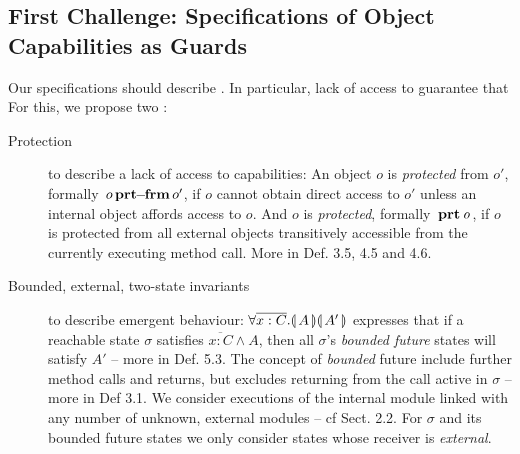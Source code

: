



\subsection{First Challenge: Specifications of Object Capabilities as Guards}
\label{s:approach:necopers}


Our specifications should describe . 
In particular, lack of access to  guarantee  that 
For this, we propose two %
:

 
\begin{description}
\item[Protection] to describe a lack of access to capabilities: An object $o$ is \emph{protected} from $o'$, formally ${\, o\, \mathbf{prt\!\!-\!\!frm}\, o'}$,  if $o$ cannot obtain direct access to $o'$ unless an internal object affords access to $o$. And $o$ is \emph{protected}, formally ${{\, \mathbf{prt}\, {\texttt{\it{o}}}\, }}$, if $o$ is protected from all external objects transitively accessible from the currently executing method call. More in Def. 3.5, 4.5 and 4.6.
\item[Bounded, external, two-state invariants] to describe emergent behaviour:  $\forall {\overline{x:C}}.{\llparenthesis}\, A \,{\rrparenthesis}{\llparenthesis}\, A' \,{\rrparenthesis}$ expresses that if a reachable state $\sigma$ 
  satisfies ${\overline{x:C}}  \wedge A$, then all $\sigma$'s \emph{bounded future} states will satisfy $A'$ -- more in Def. 5.3. The concept of \emph{bounded} future include  further method calls and returns, but excludes returning from the call active in $\sigma$ -- more in Def 3.1. 
We consider executions of the internal module linked with any number of unknown, external modules -- cf Sect. 2.2.
 For $\sigma$ and its bounded future states  we only consider states whose receiver is \emph{external}. 
\end{description}
 


